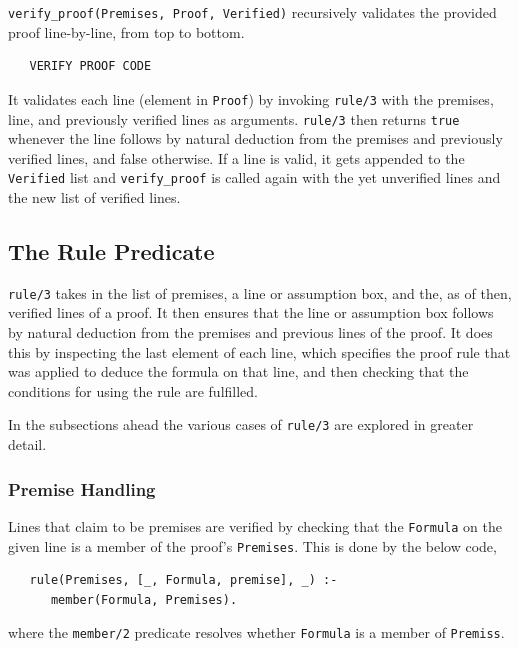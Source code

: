 \documentclass[a4paper, 11pt]{article}
\begin{document}
   \texttt{verify\_proof(Premises, Proof, Verified)}
   recursively validates the provided proof
   line-by-line, from top to bottom. 
   
\begin{verbatim}
   VERIFY PROOF CODE
\end{verbatim}

   It validates each 
   line (element in \texttt{Proof}) by invoking 
   \texttt{rule/3} with the premises, line, and 
   previously verified lines as arguments. 
   \texttt{rule/3} then returns \texttt{true} whenever 
   the line follows by natural deduction from the 
   premises and previously verified lines, and false
   otherwise. If a line is valid, it gets appended to
   the \texttt{Verified} list and \texttt{verify\_proof}
   is called again with the yet unverified lines and
   the new list of verified lines.

   \subsection{The Rule Predicate}
   \texttt{rule/3} takes in the list of premises, a
   line or assumption box, and the, as of then, 
   verified lines of a proof. It then ensures that
   the line or assumption box follows by natural
   deduction from the premises and previous lines of
   the proof. It does this by inspecting the last
   element of each line, which specifies the
   proof rule that was applied to deduce the
   formula on that line, and then checking that the
   conditions for using the rule are fulfilled.
   \bigbreak

   In the subsections ahead the various cases of
   \texttt{rule/3} are explored in greater detail.

   \subsubsection{Premise Handling}
   \label{premise-handling}
   Lines that claim to be premises are verified by checking
   that the \texttt{Formula} on the given line is a member of 
   the proof's \texttt{Premises}. This is done by the below
   code, 
   
\begin{verbatim}
   rule(Premises, [_, Formula, premise], _) :-
      member(Formula, Premises).
\end{verbatim}

   where the \texttt{member/2} predicate resolves
   whether \texttt{Formula} is a member of \texttt{Premiss}. 
\end{document}
